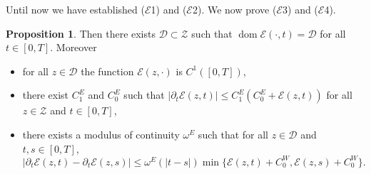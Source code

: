 \documentclass[a4paper,10pt,oneside]{amsbook}
\numberwithin{section}{chapter}
\numberwithin{equation}{chapter}
\theoremstyle{definition}
\newtheorem{prop}{Proposition}[chapter]
\DeclareMathOperator{\dom}{dom}
\begin{document}
Until now we have established ($\mathcal{E}$1) and ($\mathcal{E}$2). We now prove ($\mathcal{E}$3) and ($\mathcal{E}$4).
\begin{prop}
\label{prop:power-control-necking}
Then there exists $\mathscr{D}\subset\mathscr{Z}$ such that $\dom\mathcal{E}(\cdot,t)=\mathscr{D}$ for all $t\in[0,T]$. Moreover
\begin{itemize}
\item[(i)] for all $z\in\mathscr{D}$ the function $\mathcal{E}(z,\cdot)$ is $C^1([0,T])$,
\item[(ii)] there exist $C_1^E$ and $C_0^E$ such that $|\partial_t\mathcal{E}(z,t)|\le C_1^E(C_0^E+\mathcal{E}(z,t))$ for all $z\in\mathscr{Z}$ and $t\in[0,T]$,
\item[(iii)] there exists a modulus of continuity $\omega^E$ such that for all $z\in\mathscr{D}$ and $t,s\in[0,T]$,
\[
|\partial_t\mathcal{E}(z,t)-\partial_t\mathcal{E}(z,s)|\le\omega^E(|t-s|)\min\{\mathcal{E}(z,t)+C_0^W,\mathcal{E}(z,s)+C_0^W\}.
\]
\end{itemize}
\end{prop}
\end{document}
